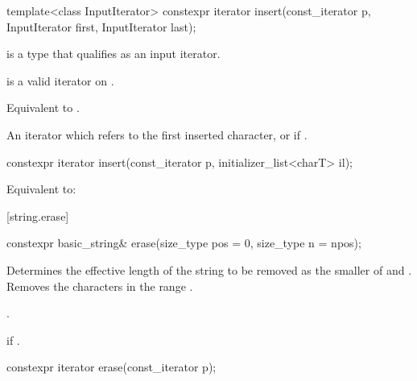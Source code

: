 %
\begin{itemdecl}
template<class InputIterator>
  constexpr iterator insert(const_iterator p, InputIterator first, InputIterator last);
\end{itemdecl}

\begin{itemdescr}
\pnum
\constraints
{} is a type that qualifies as an input
iterator.

\pnum
\expects
{} is a valid iterator on
.

\pnum
\effects
Equivalent to
.

\pnum
\returns
An iterator which refers to the first inserted character, or
 if .
\end{itemdescr}

%
\begin{itemdecl}
constexpr iterator insert(const_iterator p, initializer_list<charT> il);
\end{itemdecl}

\begin{itemdescr}
\pnum
\effects
Equivalent to: 
\end{itemdescr}

[string.erase]{}

%
\begin{itemdecl}
constexpr basic_string& erase(size_type pos = 0, size_type n = npos);
\end{itemdecl}

\begin{itemdescr}
\pnum
\effects
Determines the effective length 
of the string to be removed as the smaller of  and
.
Removes the characters in the range .

\pnum
\returns
{}.

\pnum
\throws
{}
if 
.
\end{itemdescr}

%
\begin{itemdecl}
constexpr iterator erase(const_iterator p);
\end{itemdecl}

